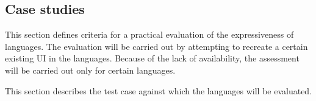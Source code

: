 \subsection{Case studies}\label{subsec:case-studies}
This section defines criteria for a practical evaluation of the expressiveness of languages.
The evaluation will be carried out by attempting to recreate a certain existing UI in the languages.
Because of the lack of availability, the assessment will be carried out only for certain languages.

This section describes the test case against which the languages will be evaluated.
